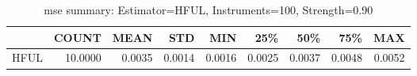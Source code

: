 \begin{table}[ht]
\centering
\caption{mse summary: Estimator=HFUL, Instruments=100, Strength=0.90}
\begin{tabular}{lrrrrrrrr}
\toprule
 & COUNT & MEAN & STD & MIN & 25\% & 50\% & 75\% & MAX \\
\midrule
HFUL & 10.0000 & 0.0035 & 0.0014 & 0.0016 & 0.0025 & 0.0037 & 0.0048 & 0.0052 \\
\bottomrule
\end{tabular}
\end{table}
